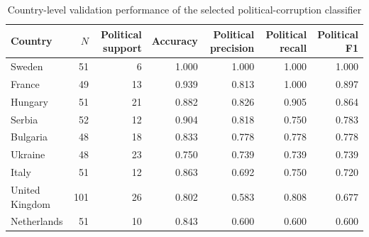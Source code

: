 \begin{table}[htbp]
\centering
\small
\caption{Country-level validation performance of the selected political-corruption classifier}
\label{tab:pc-classifier-country-validation}
\begin{tabular}{lrrrrrr}
\toprule
Country & $N$ & Political support & Accuracy & Political precision & Political recall & Political F1 \\
\midrule
Sweden & 51 & 6 & 1.000 & 1.000 & 1.000 & 1.000 \\
France & 49 & 13 & 0.939 & 0.813 & 1.000 & 0.897 \\
Hungary & 51 & 21 & 0.882 & 0.826 & 0.905 & 0.864 \\
Serbia & 52 & 12 & 0.904 & 0.818 & 0.750 & 0.783 \\
Bulgaria & 48 & 18 & 0.833 & 0.778 & 0.778 & 0.778 \\
Ukraine & 48 & 23 & 0.750 & 0.739 & 0.739 & 0.739 \\
Italy & 51 & 12 & 0.863 & 0.692 & 0.750 & 0.720 \\
United Kingdom & 101 & 26 & 0.802 & 0.583 & 0.808 & 0.677 \\
Netherlands & 51 & 10 & 0.843 & 0.600 & 0.600 & 0.600 \\
\bottomrule
\end{tabular}
\end{table}

